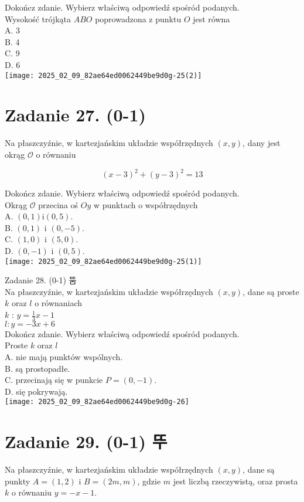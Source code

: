 \documentclass[10pt]{article}
\begin{document}
Dokończ zdanie. Wybierz właściwą odpowiedź spośród podanych.\\
Wysokość trójkąta \(A B O\) poprowadzona z punktu \(O\) jest równa\\
A. 3\\
B. 4\\
C. 9\\
D. 6\\
\texttt{[image: 2025\_02\_09\_82ae64ed0062449be9d0g-25(2)]}

\section*{Zadanie 27. (0-1)}
Na płaszczyźnie, w kartezjańskim układzie współrzędnych \((x, y)\), dany jest okrąg \(\mathcal{O}\) o równaniu

\[
(x-3)^{2}+(y-3)^{2}=13
\]

Dokończ zdanie. Wybierz właściwą odpowiedź spośród podanych.\\
Okrąg \(\mathcal{O}\) przecina oś \(O y\) w punktach o współrzędnych\\
A. \((0,1) \mathrm{i}(0,5)\).\\
B. \((0,1)\) i \((0,-5)\).\\
C. \((1,0)\) i \((5,0)\).\\
D. \((0,-1)\) i \((0,5)\).\\
\texttt{[image: 2025\_02\_09\_82ae64ed0062449be9d0g-25(1)]}

Zadanie 28. (0-1) 뚬\\
Na płaszczyźnie, w kartezjańskim układzie współrzędnych \((x, y)\), dane są proste \(k\) oraz \(l\) o równaniach\\
\(k\) : \(y=\frac{1}{3} x-1\)\\
\(l: y=-3 x+6\)\\
Dokończ zdanie. Wybierz właściwą odpowiedź spośród podanych.\\
Proste \(k\) oraz \(l\)\\
A. nie mają punktów wspólnych.\\
B. są prostopadłe.\\
C. przecinają się w punkcie \(P=(0,-1)\).\\
D. się pokrywają.\\
\texttt{[image: 2025\_02\_09\_82ae64ed0062449be9d0g-26]}

\section*{Zadanie 29. (0-1) 뚜}
Na płaszczyźnie, w kartezjańskim układzie współrzędnych \((x, y)\), dane są punkty \(A=(1,2)\) i \(B=(2 m, m)\), gdzie \(m\) jest liczbą rzeczywistą, oraz prosta \(k\) o równaniu \(y=-x-1\).
\end{document}
